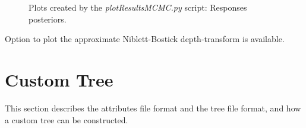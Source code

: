 \documentclass[]{scrartcl}
\begin{document}
	\begin{figure}
		\centering
		\caption{Plots created by the \textit{plotResultsMCMC.py} script: Responses posteriors.}
		\label{posterior_fits}
	\end{figure}
	\bigbreak	
	Option to plot the approximate Niblett-Bostick depth-transform is available.



    \section{Custom Tree} \label{custom_tree}
    
    This section describes the attributes file format and the tree file format, and how a custom tree can be constructed.
    
\end{document}
